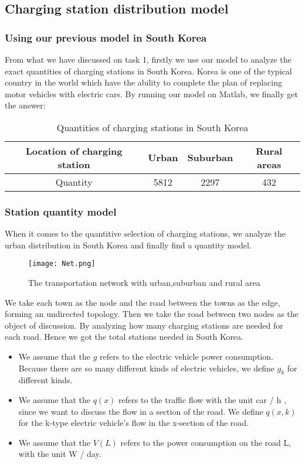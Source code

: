 \documentclass[12pt]{article}  %
\begin{document}
\subsection{Charging station distribution model}
\subsubsection{Using our previous model in South Korea}

From what we have discussed on task 1, firstly we use our model to analyze the exact quantities of charging stations in South Korea. Korea is one of the typical country in the world which have the ability to complete the plan of replacing motor vehicles with electric cars. By running our model on Matlab, we finally get the answer:
\begin{table}[H]
\caption{Quantities of charging stations in South Korea}
\begin{center}
	\begin{tabular}{cccc}
		\toprule
		Location of charging station & Urban & Suburban & Rural areas\\
		\midrule
		Quantity & 5812 & 2297 & 432\\
		\bottomrule
	\end{tabular}\label{tb:3}
\end{center}
\end{table}
\subsubsection{Station quantity model}

When it comes to the quantitive selection of charging stations, we analyze the urban distribution in South Korea and finally find a quantity model.

\begin{figure}[H]
	\centering
	\texttt{[image: Net.png]}
	\caption{The transportation network with urban,suburban and rural area}\label{fig:4}
\end{figure}

We take each town as the node and the road between the towns as the edge, forming an undirected topology. Then we take the road between two nodes as the object of discussion. By analyzing how many charging stations are needed for each road. Hence we got the total stations needed in South Korea.

\begin{itemize}
	\item We assume that the $g$ refers to the electric vehicle power consumption. Because there are so many different kinds of electric vehicles, we define ${g_k}$ for different kinds.
	\item We assume that the $q(x)$ refers to the traffic flow with the unit car / h , since we want to discuss the flow in a section of the road. We define $q(x,k)$ for the k-type electric vehicle's flow in the x-section of the road.
	\item We assume that the $V(L)$ refers to the power consumption on the road L, with the unit W / day.
\end{itemize}
\end{document}
